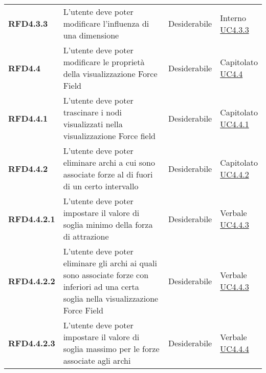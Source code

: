 \begin{longtable}[H]{| >{\raggedright\bfseries}m{20mm} | >{\raggedright}m{90mm} | >{\centering}m{25mm} | >{\centering\arraybackslash}m{30mm}|}
    RFD4.3.3
     & L'utente deve poter modificare l'influenza di una dimensione
     & Desiderabile
     & \makecell{ Interno                                                                                                \\ \hyperref[par:uc4.3.3]{UC4.3.3} }\\

    RFD4.4
     & L'utente deve poter modificare le proprietà della visualizzazione Force Field
     & Desiderabile
     & \makecell{ Capitolato                                                                                             \\ \hyperref[ssub:uc4.4]{UC4.4} }\\

    RFD4.4.1
     & L'utente deve poter trascinare i nodi visualizzati nella visualizzazione Force field
     & Desiderabile
     & \makecell{ Capitolato                                                                                             \\ \hyperref[par:uc4.4.1]{UC4.4.1} }\\

    RFD4.4.2
     & L'utente deve poter eliminare archi a cui sono associate forze al di fuori di un certo intervallo
     & Desiderabile
     & \makecell{ Capitolato                                                                                             \\ \hyperref[par:uc4.4.2]{UC4.4.2} }\\

    RFD4.4.2.1
     & L'utente deve poter impostare il valore di soglia minimo della forza di attrazione
     & Desiderabile
     & \makecell{ Verbale                                                                                                \\ \hyperref[par:uc4.4.3]{UC4.4.3} }\\

    RFD4.4.2.2
     & L'utente deve poter eliminare gli archi ai quali sono associate forze con inferiori ad una certa soglia
    nella visualizzazione Force Field
     & Desiderabile
     & \makecell{ Verbale                                                                                                \\ \hyperref[par:uc4.4.3]{UC4.4.3} }\\


    RFD4.4.2.3
     & L'utente deve poter impostare il valore di soglia massimo per le forze associate agli archi
     & Desiderabile
     & \makecell{ Verbale                                                                                                \\ \hyperref[par:uc4.4.4]{UC4.4.4} }\\


\end{longtable}

